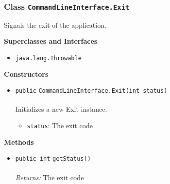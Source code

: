 \subsubsection{Class \lstinline|CommandLineInterface.Exit|}
Signals the exit of the application. \\
\noindent\begin{minipage}[t]{5cm}
\vspace{0.3em}
\hspace*{2em}
\vspace{0.3em}
\end{minipage}



\textbf{\sffamily Superclasses and Interfaces}
\begin{itemize}
\item \lstinline|java.lang.Throwable|
\end{itemize}


\textbf{\sffamily Constructors}
\begin{itemize}
\item \lstinline|public| \lstinline|CommandLineInterface.Exit|\lstinline|(int status)|\\ \\[-0.6em]
Initializes a new Exit instance.
\begin{itemize}
\item \lstinline|status|: The exit code
\end{itemize}



\end{itemize}


\textbf{\sffamily Methods}
\begin{itemize}
\item \lstinline|public int| \lstinline|getStatus|\lstinline|()|\\ \\[-0.6em]
\emph{Returns:} The exit code



\end{itemize}


